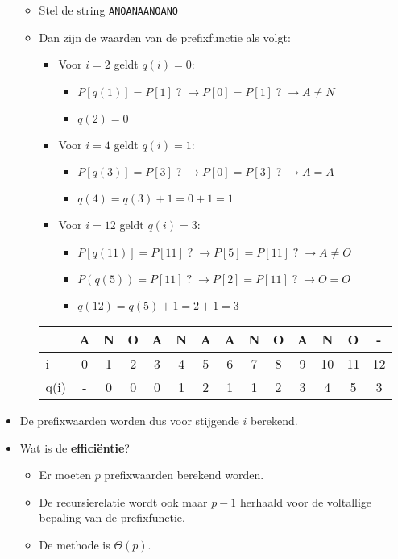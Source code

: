 \begin{itemize}
    \begin{itemize}
        \item Stel de string \texttt{ANOANAANOANO}
        \item Dan zijn de waarden van de prefixfunctie als volgt:
        \begin{itemize}
            \item Voor $i = 2$ geldt $q(i) = 0$:
            \begin{itemize}
                \item $P[q(1)] = P[1]\;?\;\rightarrow P[0] = P[1]\;?\;\rightarrow A \neq N$
                \item $q(2) = 0$
            \end{itemize} 
            \item Voor $i = 4$ geldt $q(i) = 1$:
            \begin{itemize}
                \item $P[q(3)] = P[3]\;?\;\rightarrow P[0] = P[3]\;?\;\rightarrow A = A$
                \item $q(4) = q(3) + 1 = 0 + 1 = 1$
            \end{itemize}
            \item Voor $i = 12$ geldt $q(i) = 3$:
            \begin{itemize}
                \item $P[q(11)] = P[11]\;?\;\rightarrow P[5] = P[11]\;?\;\rightarrow A \neq O$
                \item $P(q(5)) = P[11]\;?\;\rightarrow P[2] = P[11]\;?\;\rightarrow O = O$
                \item $q(12) = q(5) + 1 = 2 + 1 = 3$
            \end{itemize}
        \end{itemize}

        \begin{table}[ht]
            \centering
            \begin{tabular}{l | c c c c c c c c c c c c c}
                     & A & N & O & A & N & A & A & N & O & A  & N  & O  & - \\
                     \hline
                i    & 0 & 1 & 2 & 3 & 4 & 5 & 6 & 7 & 8 & 9 & 10 & 11 & 12  \\
                q(i) & - & 0 & 0 & 0 & 1 & 2 & 1 & 1 & 2 & 3  & 4  & 5 & 3 
            \end{tabular}
        \end{table}
    \end{itemize}
    \item De prefixwaarden worden dus voor stijgende $i$ berekend.
    \item Wat is de \textbf{efficiëntie}?
    \begin{itemize}
        \item Er moeten $p$ prefixwaarden berekend worden.
        \item De recursierelatie wordt ook maar $p-1$ herhaald voor de voltallige bepaling van de prefixfunctie.
        \item De methode is $\Theta(p)$.
    \end{itemize}
\end{itemize}

